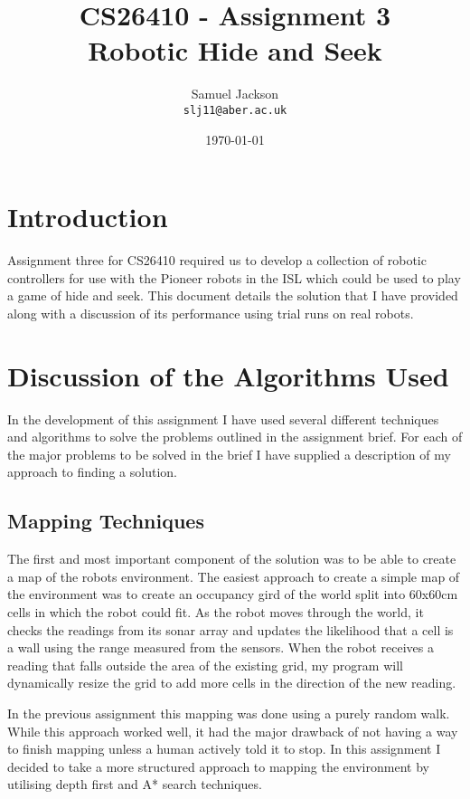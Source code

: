 \documentclass{article}
\begin{document}
\title{CS26410 - Assignment 3 \\ Robotic Hide and Seek}
\author{Samuel Jackson \\ \texttt{slj11@aber.ac.uk}}
\date{\today}
\maketitle

\section{Introduction}
Assignment three for CS26410 required us to develop a collection of robotic controllers for use with the Pioneer robots in the ISL which could be used to play a game of hide and seek. This document details the solution that I have provided along with a discussion of its performance using trial runs on real robots.

\section{Discussion of the Algorithms Used}
In the development of this assignment I have used several different techniques and algorithms to solve the problems outlined in the assignment brief. For each of the major problems to be solved in the brief I have supplied a description of my approach to finding a solution.

\subsection{Mapping Techniques}
The first and most important component of the solution was to be able to create a map of the robots environment. The easiest approach to create a simple map of the environment was to create an occupancy gird of the world split into 60x60cm cells in which the robot could fit. As the robot moves through the world, it checks the readings from its sonar array and updates the likelihood that a cell is a wall using the range measured from the sensors. When the robot receives a reading that falls outside the area of the existing grid, my program will dynamically resize the grid to add more cells in the direction of the new reading.

In the previous assignment this mapping was done using a purely random walk. While this approach worked well, it had the major drawback of not having a way to finish mapping unless a human actively told it to stop. In this assignment I decided to take a more structured approach to mapping the environment by utilising depth first and A* search techniques.
\end{document}
